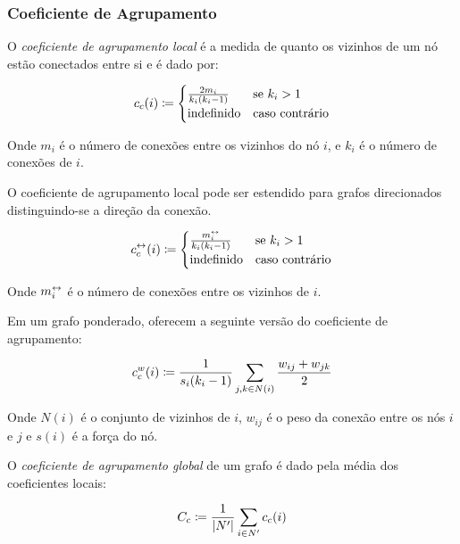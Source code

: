 \documentclass[12pt,a4paper]{article}
\begin{document}
\subsubsection{Coeficiente de Agrupamento} \label{sec:coeficiente-agrupamento}

O \textit{coeficiente de agrupamento local} é a medida de quanto os vizinhos de um nó estão conectados entre si e é dado por:

\begin{equation}
c_c(i) \coloneqq \begin{cases}
    \frac{2m_i}{k_i(k_i - 1)} & \text{se}\ k_i > 1 \\
    \text{indefinido}         & \text{caso contrário}
  \end{cases}
\end{equation}

Onde $m_i$ é o número de conexões entre os vizinhos do nó $i$, e $k_i$ é o número de conexões de $i$.

O coeficiente de agrupamento local pode ser estendido para grafos direcionados distinguindo-se a direção da conexão.

\begin{equation}
c^\leftrightarrow_c(i) \coloneqq \begin{cases}
    \frac{m^\leftrightarrow_i}{k_i(k_i - 1)} & \text{se}\ k_i > 1 \\
    \text{indefinido}                  & \text{caso contrário}
  \end{cases}
\end{equation}

Onde $m^\leftrightarrow_i$ é o número de conexões entre os vizinhos de $i$.

Em um grafo ponderado,  oferecem a seguinte versão do coeficiente de agrupamento:

\begin{equation}
c^w_c(i) \coloneqq \frac{1}{s_i(k_i - 1)} \sum_{j,k \in N(i)} \frac{w_{ij} + w_{jk}}{2}
\end{equation}

Onde $N(i)$ é o conjunto de vizinhos de $i$, $w_{ij}$ é o peso da conexão entre os nós $i$ e $j$ e $s(i)$ é a força do nó.

O \textit{coeficiente de agrupamento global} de um grafo é dado pela média dos coeficientes locais:

\begin{equation}
C_c \coloneqq \frac{1}{|N'|} \sum_{i \in N'} c_c(i)
\end{equation}
\end{document}

